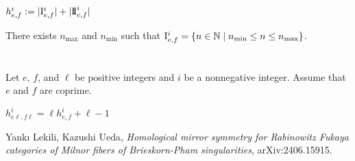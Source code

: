 \begin{definition}
\label{def:h}
\leanok
$
h_{e,f}^i
:=
|\mathrm{I}_{e,f}^i| + |\mathrm{I\!I}_{e,f}^i|
$
\end{definition}

\begin{lemma}
There exists $n_{\max}$ and $n_{\min}$ such that
$\mathrm{I}_{e,f}^i = \{n \in \mathbb{N} \mid n_{\min} \le n \le n_{\max}\}$.
\end{lemma}

\section{}

Let $e$, $f$, and $\ell$ be positive integers
and $i$ be a nonnegative integer.
Assume that $e$ and $f$ are coprime.

\begin{proposition}[{\cite[Proposition 5.1]{2406.15915}}]
\label{prop:main}
$
h_{e \ell, f \ell}^i = \ell h_{e,f}^i + \ell - 1
$
\end{proposition}

\begin{thebibliography}{LU}
Yank{\i} Lekili, Kazushi Ueda,
\emph{Homological mirror symmetry for Rabinowitz Fukaya categories
of Milnor fibers of Brieskorn-Pham singularities},
arXiv:2406.15915.
\end{thebibliography}